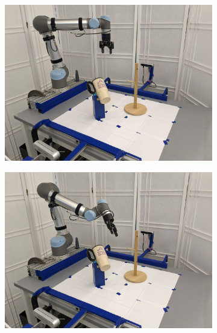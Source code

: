 \documentclass{article}
\begin{document}
\begin{figure}[]
    \centering

    \begin{subfigure}{(\linewidth - 0.05\linewidth)/5}
        \centering
        \includegraphics[width=\linewidth]{figures/episodes/mug_on_tree/1.jpg}
    \end{subfigure}
    \begin{subfigure}{(\linewidth - 0.05\linewidth)/5}
        \centering
        \includegraphics[width=\linewidth]{figures/episodes/mug_on_tree/2.jpg}
    \end{subfigure}
    \begin{subfigure}{(\linewidth - 0.05\linewidth)/5}
        \centering

\end{subfigure}
\end{figure}
\end{document}
